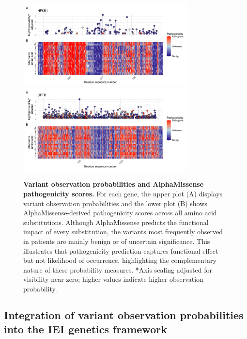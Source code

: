 \begin{figure}[ht]
\begin{center}
    \includegraphics[width=0.8\textwidth]{../images/p_alphamissense_NFKB1.pdf}
    \includegraphics[width=0.8\textwidth]{../images/p_alphamissense_CFTR.pdf}
\end{center}
\caption{\textbf{Variant observation probabilities and AlphaMissense pathogenicity scores.} 
For each gene, the upper plot (A) displays variant observation probabilities and the lower plot (B) shows AlphaMissense-derived pathogenicity scores across all amino acid substitutions. Although AlphaMissense predicts the functional impact of every substitution, the variants most frequently observed in patients are mainly benign or of uncertain significance. This illustrates that pathogenicity prediction captures functional effect but not likelihood of occurrence, highlighting the complementary nature of these probability measures. *Axis scaling adjusted for visibility near zero; higher values indicate higher observation probability.}
 \label{fig:alphamissense}
\end{figure}

\subsection{Integration of variant observation probabilities into the IEI genetics framework}

